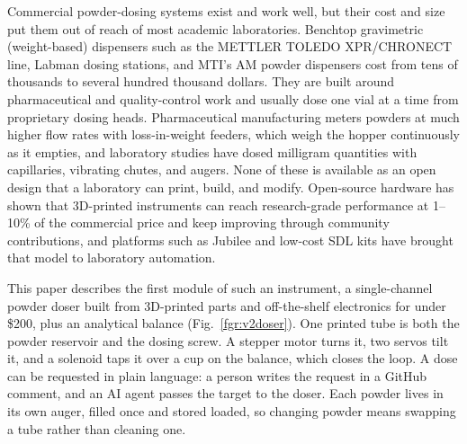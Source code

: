 \documentclass[twoside,twocolumn,9pt]{article}
\begin{document}
Commercial powder-dosing systems exist and work well, but their cost and size put them out of reach of most academic laboratories. Benchtop gravimetric (weight-based) dispensers such as the METTLER TOLEDO XPR/CHRONECT line, Labman dosing stations, and MTI's AM powder dispensers cost from tens of thousands to several hundred thousand dollars. They are built around pharmaceutical and quality-control work and usually dose one vial at a time from proprietary dosing heads.\cite{Besenhard2015Accuracy,Yang2007Metering} Pharmaceutical manufacturing meters powders at much higher flow rates with loss-in-weight feeders, which weigh the hopper continuously as it empties,\cite{Engisch2012Method,Engisch2015Feedrate,Hanson2018Control} and laboratory studies have dosed milligram quantities with capillaries, vibrating chutes, and augers.\cite{Besenhard2017Micro,Faulhammer2014Dose,Chianrabutra2014Powder,Alsenz2011Powderpicking} None of these is available as an open design that a laboratory can print, build, and modify. Open-source hardware has shown that 3D-printed instruments can reach research-grade performance at 1--10\% of the commercial price and keep improving through community contributions,\cite{Pearce2020Economic,Hohlbein2022Open,Wenzel2023Open,Stirling2022Hardops} and platforms such as Jubilee and low-cost SDL kits have brought that model to laboratory automation.\cite{Vasquez2020Jubilee,Subbaraman2024Duckbot}

This paper describes the first module of such an instrument, a single-channel powder doser built from 3D-printed parts and off-the-shelf electronics for under \$200, plus an analytical balance (Fig.~\ref{fgr:v2doser}). One printed tube is both the powder reservoir and the dosing screw. A stepper motor turns it, two servos tilt it, and a solenoid taps it over a cup on the balance, which closes the loop. A dose can be requested in plain language: a person writes the request in a GitHub comment, and an AI agent passes the target to the doser. Each powder lives in its own auger, filled once and stored loaded, so changing powder means swapping a tube rather than cleaning one.
\end{document}
